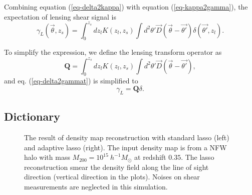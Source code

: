 \documentclass[twocolumn]{aastex62}
\begin{document}
Combining equation (\ref{eq-delta2kappa}) with equation (\ref{eq-kappa2gamma}), the expectation of lensing shear signal is
\begin{equation}\label{eq-delta2gammat}
\gamma_L(\vec{\theta},z_s) = \int_0^{z_s} dz_l K(z_l,z_s) \int d^2 \theta' \vec{D}(\vec{\theta}-\vec{\theta'}) \delta(\vec{\theta'},z_l).
\end{equation}

To simplify the expression, we define the lensing transform operator as
\begin{equation}
\mathbf{Q}=\int_0^{z_s} dz_l K(z_l,z_s) \int d^2 \theta'  \vec{D}(\vec{\theta}-\vec{\theta'}),
\end{equation}
and eq. (\ref{eq-delta2gammat}) is simplified to
\begin{equation} \label{eq-delta2gammat-simp}
\gamma_L=\mathbf{Q}\delta.
\end{equation}

\subsection{Dictionary}
\label{subsec:method-dictionary}

\begin{figure}[!t]
\centering
{}
\caption{The result of density map reconstruction with standard lasso (left) and adaptive lasso (right). The input density
        map is from a NFW halo with mass $M_{200}=10^{15} ~h^{-1}M_{\odot}$ at redshift $0.35$. The lasso reconstruction
        smear the density field along the line of sight direction (vertical direction in the plots). Noises on shear measurements
        are neglected in this simulation.} \label{fig-lassoVsadaLasso}
\end{figure}
\end{document}
